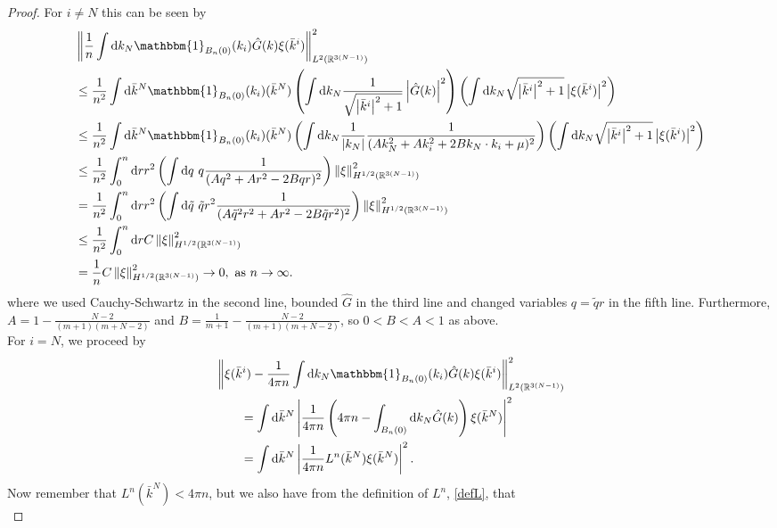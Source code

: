 \documentclass[a4paper,11pt]{article}
\newcommand{\norm}[1]{\left\lVert #1 \right\rVert}
\newcommand{\abs}[1]{\left\lvert #1 \right\rvert}
\newcommand*\diff{\mathop{}\!\mathrm{d}}
\newcommand{\R}{\mathbb{R}}
\numberwithin{equation}{section}
\begin{document}
\begin{proof}
	For $ i\neq N $ this can be seen by \begin{equation}
	\begin{aligned}
	&\norm{\frac{1}{n}\int \diff k_N \mathbbm{1}_{B_n(0)}(k_i)\hat{G}(k)\xi(\bar{k}^i)}^2_{L^{2}(\R^{3(N-1)})}\\&\leq\frac{1}{n^2}\int\diff \bar{k}^N\mathbbm{1}_{B_n(0)}(k_i)(\bar{k}^N)\left(\int \diff k_N \frac{1}{\sqrt{\abs{\bar{k}^i}^2+1}}\abs{\hat{G}(k)}^{2}\right)\left(\int\diff k_N \sqrt{\abs{\bar{k}^i}^2+1}\abs{\xi(\bar{k}^i)}^2\right)\\
	&\leq\frac{1}{n^2}\int\diff \bar{k}^N\mathbbm{1}_{B_n(0)}(k_i)(\bar{k}^N)\left(\int \diff k_N \frac{1}{\abs{k_N}}\frac{1}{(Ak_N^2+Ak_i^2+2Bk_N\cdot k_i+\mu)^2}\right)\left(\int\diff k_N \sqrt{\abs{\bar{k}^i}^2+1}\abs{\xi(\bar{k}^i)}^2\right)\\
	&\leq\frac{1}{n^2}\int_{0}^{n}\diff r r^2\left(\int \diff q\ q\frac{1}{(Aq^2+Ar^2-2Bqr)^2}\right)\norm{\xi}^2_{H^{1/2}(\R^{3(N-1)})}\\
	&=\frac{1}{n^2}\int_{0}^{n}\diff r r^2\left(\int \diff \tilde{q}\ \tilde{q} r^2\frac{1}{(A\tilde{q}^2r^2+Ar^2-2B\tilde{q}r^2)^2}\right)\norm{\xi}^2_{H^{1/2}(\R^{3(N-1)})}\\
	&\leq\frac{1}{n^2}\int_{0}^{n}\diff r C\norm{\xi}^2_{H^{1/2}(\R^{3(N-1)})}\\
	&=\frac{1}{n}C\norm{\xi}^2_{H^{1/2}(\R^{3(N-1)})}\to 0,\text{ as }n\to\infty.
	\end{aligned}
	\end{equation}
	where we used Cauchy-Schwartz in the second line, bounded $ \hat{G} $ in the third line and changed variables $ q=\tilde{q}r $ in the fifth line. Furthermore, $ A=1-\frac{N-2}{(m+1)(m+N-2)} $ and $ B=\frac{1}{m+1}-\frac{N-2}{(m+1)(m+N-2)} $, so $ 0<B<A<1 $ as above.\\
	For $ i=N $, we proceed by
	\begin{equation}
	\begin{aligned}
	&\norm{\xi(\bar{k}^i)-\frac{1}{4\pi n}\int \diff k_N \mathbbm{1}_{B_n(0)}(k_i)\hat{G}(k)\xi(\bar{k}^i)}^2_{L^2(\R^{3(N-1)})}\\&\qquad
	=\int\diff \bar{k}^N\abs{\frac{1}{4\pi n}\left(4\pi n-\int_{B_n(0)}\diff k_N\hat{G}(k)\right)\xi(\bar{k}^N)}^2\\&\qquad
	=\int\diff \bar{k}^N\abs{\frac{1}{4\pi n}L^n(\bar{k}^N)\xi(\bar{k}^N)}^2.
	\end{aligned}
	\end{equation}
	Now remember that $ L^n(\bar{k}^N)<4\pi n $, but we also have from the definition of $ L^n $, \eqref{defL}, that \begin{equation}

\end{equation}
\end{proof}
\end{document}
